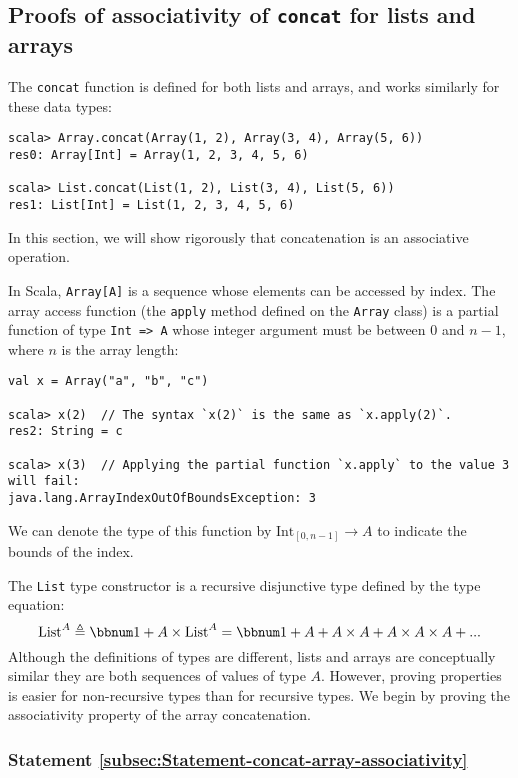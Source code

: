 \subsection{Proofs of associativity of \texttt{concat} for lists and arrays\label{subsec:Proofs-for-associativity-law-lists-and-arrays-concat}}

The \lstinline!concat! function is defined for both lists and arrays,
and works similarly for these data types:
\begin{lstlisting}
scala> Array.concat(Array(1, 2), Array(3, 4), Array(5, 6))
res0: Array[Int] = Array(1, 2, 3, 4, 5, 6)

scala> List.concat(List(1, 2), List(3, 4), List(5, 6))
res1: List[Int] = List(1, 2, 3, 4, 5, 6)
\end{lstlisting}
In this section, we will show rigorously that concatenation is an
associative operation.

In Scala, \lstinline!Array[A]! is a sequence whose elements can be
accessed by index. The array access function (the \lstinline!apply!
method defined on the \lstinline!Array! class) is a partial function
of type \lstinline!Int => A! whose integer argument must be between
$0$ and $n-1$, where $n$ is the array length:
\begin{lstlisting}
val x = Array("a", "b", "c")

scala> x(2)  // The syntax `x(2)` is the same as `x.apply(2)`. 
res2: String = c

scala> x(3)  // Applying the partial function `x.apply` to the value 3 will fail:
java.lang.ArrayIndexOutOfBoundsException: 3
\end{lstlisting}
We can denote the type of this function by $\text{Int}_{[0,n-1]}\rightarrow A$
to indicate the bounds of the index.

The \lstinline!List! type constructor is a recursive disjunctive
type defined by the type equation:
\[
\text{List}^{A}\triangleq\bbnum 1+A\times\text{List}^{A}=\bbnum 1+A+A\times A+A\times A\times A+...
\]
Although the definitions of types are different, lists and arrays
are conceptually similar \textemdash{} they are both sequences of
values of type $A$. However, proving properties is easier for non-recursive
types than for recursive types. We begin by proving the associativity
property of the array concatenation. 

\subsubsection{Statement \label{subsec:Statement-concat-array-associativity}\ref{subsec:Statement-concat-array-associativity}}

